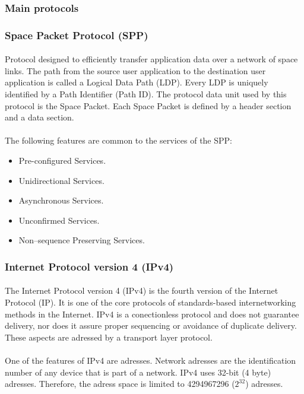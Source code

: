 \subsubsection{Main protocols}

\subsubsection*{Space Packet Protocol (SPP)\cite{SPP}}
\paragraph{}Protocol designed to efficiently transfer application data over a network of space links. The path from the source user application to the destination user application is called a Logical Data Path (LDP). Every LDP is uniquely identified by a Path Identifier (Path ID). The protocol data unit used by this protocol is the Space Packet. Each Space Packet is defined by a header section and a data section.
\paragraph{}The following features are common to the services of the SPP:
\begin{itemize}
\item Pre-configured Services. 
\item Unidirectional Services.
\item Asynchronous Services.
\item Unconfirmed Services. 
\item Non–sequence Preserving Services.
\end{itemize}
\subsubsection{Internet Protocol version 4 (IPv4)\cite{IP}}
\paragraph{}The Internet Protocol version 4 (IPv4) is the fourth version of the Internet Protocol (IP). It is one of the core protocols of standards-based internetworking methods in the Internet. IPv4 is a conectionless protocol and does not guarantee delivery, nor does it assure proper sequencing or avoidance of duplicate delivery. These aspects are adressed by a transport layer protocol.
\paragraph{}One of the features of IPv4 are adresses. Network adresses are the identification number of any device that is part of a network. IPv4 uses 32-bit (4 byte) adresses. Therefore, the adress space is limited to 4294967296 ($2^{32}$) adresses.
